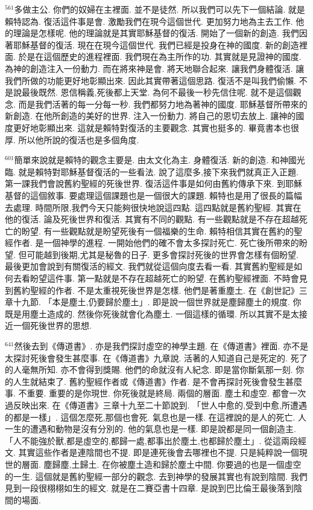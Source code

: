 \documentclass{book}
\begin{document}
$^{561}$多做主公.
你們的奴婦在主裡面.
並不是徒然.
所以我們可以先下一個結論.
就是賴特認為.
復活這件事是會.
激勵我們在現今這個世代.
更加努力地為主去工作.
他的理論是怎樣呢.
他的理論就是其實耶穌基督的復活.
開始了一個新的創造.
我們因著耶穌基督的復活.
現在在現今這個世代.
我們已經是投身在神的國度.
新的創造裡面.
於是在這個歷史的進程裡面.
我們現在為主所作的功.
其實就是見證神的國度.
為神的創造注入一份動力.
而在將來神是會.
將天地聯合起來.
讓我們身體復活.
讓我們所做的功能更好地彰顯出來.
因此其實帶著這個思路.
復活不是叫我們偷懶.
不是說最後既然.
恩信稱義,死後都上天堂.
為何不最後一秒先信住呢.
就不是這個觀念.
而是我們活著的每一分每一秒.
我們都努力地為著神的國度.
耶穌基督所帶來的新創造.
在他所創造的美好的世界.
注入一份動力.
將自己的恩切去放上.
讓神的國度更好地彰顯出來.
這就是賴特對復活的主要觀念.
其實也挺多的.
畢竟書本也很厚.
所以他所說的復活也是多個角度.

$^{601}$簡單來說就是賴特的觀念主要是.
由太文化為主.
身體復活.
新的創造.
和神國光臨.
就是賴特對耶穌基督復活的一些看法.
說了這麼多,接下來我們就真正入正題.
第一課我們會說舊約聖經的死後世界.
復活這件事是如何由舊約傳承下來.
到耶穌基督的這個敘事.
要處理這個課題也是一個很大的課題.
賴特也是用了很長的篇幅去處理.
時間所限,我們今天只能夠很快地說這四點.
這四點就是舊約聖經.
其實在他的復活.
論及死後世界和復活.
其實有不同的觀點.
有一些觀點就是不存在超越死亡的盼望.
有一些觀點就是盼望死後有一個福樂的生命.
賴特相信其實在舊約的聖經作者.
是一個神學的進程.
一開始他們的確不會太多探討死亡.
死亡後所帶來的盼望.
但可能越到後期,尤其是秘魯的日子.
更多會探討死後的世界會怎樣有個盼望.
最後更加會說到有關復活的經文.
我們就從這個向度去看一看.
其實舊約聖經是如何去看盼望這件事.
第一點就是不存在超越死亡的盼望.
在舊約聖經裡面.
不時會見到舊約聖經的作者.
不是太重視死後世界是怎樣.
他們是著重塵土.
在《創世記》三章十九節.
「本是塵土,仍要歸於塵土」.
即是說一個世界就是塵歸塵土的規度.
你既是用塵土造成的.
然後你死後就會化為塵土.
一個這樣的循環.
所以其實不是太接近一個死後世界的思想.

$^{641}$然後去到《傳道書》.
亦是我們探討虛空的神學主題.
在《傳道書》裡面.
亦不是太探討死後會發生甚麼事.
在《傳道書》九章說.
活著的人知道自己是死定的.
死了的人毫無所知.
亦不會得到獎賜.
他們的命就沒有人紀念.
即是當你斷氣那一刻.
你的人生就結束了.
舊約聖經作者或《傳道書》作者.
是不會再探討死後會發生甚麼事.
不重要.
重要的是你現世.
你死後就是終局.
兩個的層面.
塵土和虛空.
都會一次過反映出來.
在《傳道書》三章十九至二十節說到.
「世人中愈的,受到中愈,所遭遇的都是一樣」.
這個怎麼死,那個也會死.
氣息也是一樣.
在這裡說的是人的死亡.
人一生的遭遇和動物是沒有分別的.
他的氣息也是一樣.
即是說都是同一個創造主.
「人不能強於獸,都是虛空的,都歸一處,都事出於塵土,也都歸於塵土」.
從這兩段經文.
其實這些作者是連陰間也不提.
即是連死後會去哪裡也不提.
只是純粹說一個現世的層面.
塵歸塵,土歸土.
在你被塵土造和歸於塵土中間.
你要過的也是一個虛空的一生.
這個就是舊約聖經一部分的觀念.
去到神學的發展其實也有說到陰間.
我們見到一段很栩栩如生的經文.
就是在二賽亞書十四章.
是說到巴比倫王最後落到陰間的場面.
\end{document}
